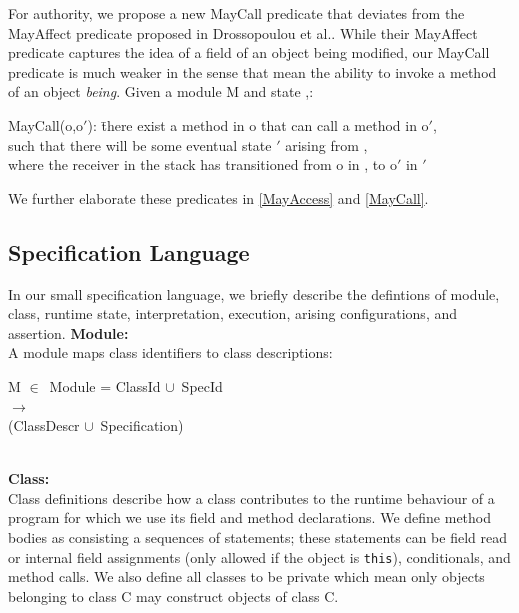 \documentclass[a4paper,11pt,twoside]{article}
\newenvironment{logic}
{\begin{minipage}[c]{\linewidth}  \sffamily \mdseries \begin{tabbing}}
{\end{tabbing}\end{minipage}\vspace{0.3em}}
\newcommand{\loin}{$\in$}
\newcommand{\losigma}{\text{$\upsigma$}}
\newcommand{\locup} {$\cup$}
\newcommand{\ablock} {\null\qquad}
\begin{document}
For authority, we propose a new MayCall predicate that deviates from the MayAffect predicate proposed in Drossopoulou et al.\cite{drossopoulou2016}. While their MayAffect predicate captures the idea of a field of an object being modified, our MayCall predicate is much weaker in the sense that mean the ability to invoke a method of an object \textit{being}. Given a module M and state \losigma,:
\begin{tabbing}
MayCall(o,o$'$): \=there exist a method in o that can call a method in o$'$,\\ \> such that there will be some eventual state \losigma$'$ arising from \losigma,\\ \> where the receiver in the stack has transitioned from o in \losigma, to o$'$ in \losigma$'$\\
\end{tabbing}

We further elaborate these predicates in \cref{MayAccess} and \cref{MayCall}.
\subsection{Specification Language}\label{sec:speclang}
In our small specification language, we briefly describe the defintions of module, class, runtime state, interpretation, execution, arising configurations, and assertion.
\textbf{Module:}\\
A module maps class identifiers to class descriptions:\\
\begin{logic}
M \loin\ Module = ClassId \locup\ SpecId\\\ablock\qquad\qquad\quad $\rightarrow$ \\
\ablock \qquad \qquad \quad (ClassDescr \locup\ Specification)
\end{logic}\\

\textbf{Class:}\\
Class definitions describe how a class contributes to the runtime behaviour of a program for which we use its field and method declarations. We define method bodies as consisting a sequences of statements; these statements can be field read or internal field assignments (only allowed if the object is \texttt{this}), conditionals, and method calls. We also define all classes to be private which mean only objects belonging to class C may construct objects of class C.\\
\end{document}
